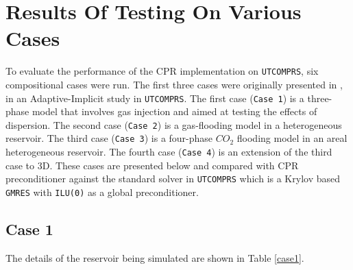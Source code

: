 \chapter{Results Of Testing On Various Cases}
To evaluate the performance of the CPR implementation on \texttt{UTCOMPRS}, six compositional cases were run. 
The first three cases were originally presented in \cite{fernandes}, in an Adaptive-Implicit study in \texttt{UTCOMPRS}. 
The first case (\texttt{Case 1}) is a three-phase model that involves gas injection and aimed 
at testing the effects of dispersion. The second case (\texttt{Case 2}) is a gas-flooding model in 
a heterogeneous reservoir. The third case (\texttt{Case 3}) is a four-phase $CO_{2}$ flooding model 
in an areal heterogeneous reservoir. The fourth case (\texttt{Case 4}) is an extension of the third case to 3D. 
These cases are presented below and compared with CPR preconditioner against
the standard solver in \texttt{UTCOMPRS} which is a Krylov based \texttt{GMRES} with \texttt{ILU(0)} as a global
preconditioner. 

\section{Case 1}
The details of the reservoir being simulated are shown in Table \ref{case1}. 


